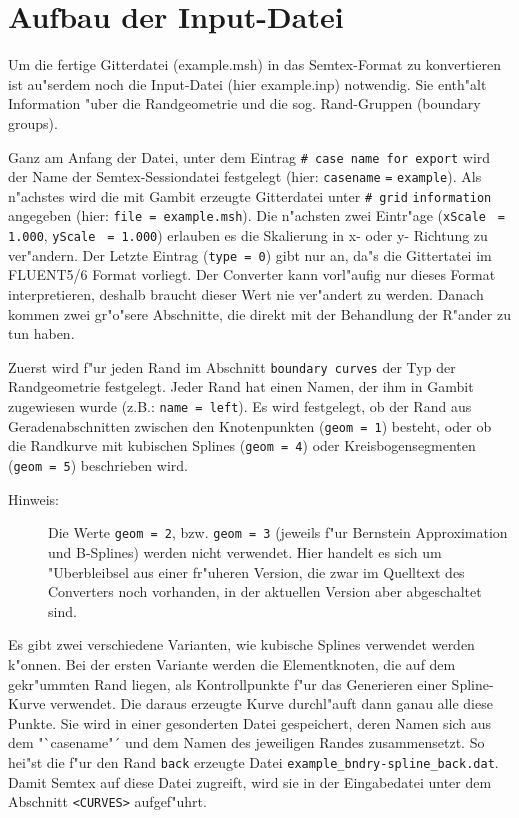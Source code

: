 \documentclass{article}
\begin{document}
\newpage
\section{Aufbau der Input-Datei}

Um die fertige Gitterdatei (example.msh) in das Semtex-Format zu konvertieren ist au"serdem noch die Input-Datei (hier example.inp) notwendig. Sie enth"alt Information "uber die Randgeometrie und die sog. Rand-Gruppen (boundary groups).

Ganz am Anfang der Datei, unter dem Eintrag \verb|# case name for export| wird der Name der Semtex-Sessiondatei festgelegt (hier: \verb|casename| \verb|=| \verb|example|). Als n"achstes wird die mit Gambit erzeugte Gitterdatei unter \verb|# grid| \linebreak \verb|information| angegeben (hier: \verb|file = example.msh|). Die n"achsten zwei Eintr"age (\verb|xScale| \verb| = 1.000|, \verb|yScale| \verb| = 1.000|) erlauben es die Skalierung in x- oder y- Richtung zu ver"andern. Der Letzte Eintrag (\verb|type = 0|) gibt nur an, da"s die Gittertatei im FLUENT5/6 Format vorliegt. Der Converter kann vorl"aufig nur dieses Format interpretieren, deshalb braucht dieser Wert nie ver"andert zu werden. Danach kommen zwei gr"o"sere Abschnitte, die direkt mit der Behandlung der R"ander zu tun haben.

Zuerst wird f"ur jeden Rand im Abschnitt \verb|boundary curves| der Typ der Randgeometrie festgelegt.
Jeder Rand hat einen Namen, der ihm in Gambit zugewiesen wurde (z.B.: \verb|name = left|). Es wird festgelegt, ob der Rand aus Geradenabschnitten zwischen den Knotenpunkten (\verb|geom = 1|) besteht, oder ob die Randkurve mit kubischen Splines (\verb|geom = 4|) oder Kreisbogensegmenten (\verb|geom = 5|) beschrieben wird. 

\begin{description}
\item [Hinweis:] Die Werte \verb|geom = 2|, bzw. \verb|geom = 3| (jeweils f"ur Bernstein Approximation und B-Splines) werden nicht verwendet. Hier handelt es sich um "Uberbleibsel aus einer fr"uheren Version, die zwar im Quelltext des Converters noch vorhanden, in der aktuellen Version aber abgeschaltet sind.
\end{description}

Es gibt zwei verschiedene Varianten, wie kubische Splines verwendet werden k"onnen. Bei der ersten Variante werden die Elementknoten, die auf dem gekr"ummten Rand liegen, als Kontrollpunkte f"ur das Generieren einer Spline-Kurve verwendet. Die daraus erzeugte Kurve durchl"auft dann ganau alle diese Punkte. Sie wird in einer gesonderten Datei gespeichert, deren Namen sich aus dem "`casename"´ und dem Namen des jeweiligen Randes zusammensetzt. So hei"st die f"ur den Rand \verb|back| erzeugte Datei \verb|example_bndry-spline_back.dat|. Damit Semtex auf diese Datei zugreift, wird sie in der Eingabedatei unter dem Abschnitt \verb|<CURVES>| aufgef"uhrt.
\end{document}
